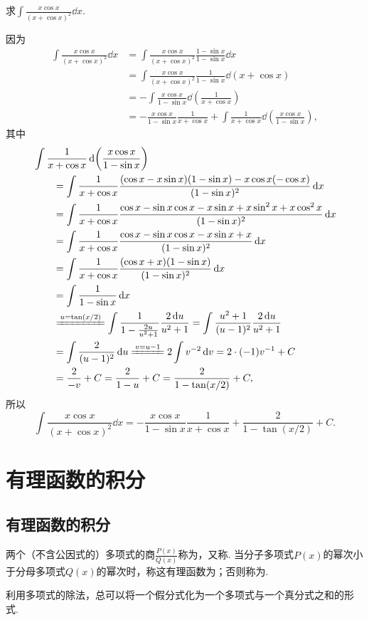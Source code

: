 \begin{example}
求\(\displaystyle\int \frac{x \cos x}{(x + \cos x)^2}\dd{x}\).
\begin{solution}
因为\begin{align*}
\int \frac{x \cos x}{(x + \cos x)^2}\dd{x}
&= \int \frac{x \cos x}{(x + \cos x)^2} \frac{1 - \sin x}{1 - \sin x}\dd{x} \\
&= \int \frac{x \cos x}{(x + \cos x)^2} \frac{1}{1 - \sin x} \dd(x + \cos x) \\
&= -\int \frac{x \cos x}{1 - \sin x} \dd(\frac{1}{x + \cos x}) \\
&= -\frac{x \cos x}{1 - \sin x} \frac{1}{x + \cos x}
	+\int \frac{1}{x + \cos x} \dd(\frac{x \cos x}{1 - \sin x}),
\end{align*}
其中
\begin{align*}
&\int \frac{1}{x + \cos x} \dd(\frac{x \cos x}{1 - \sin x}) \\
&\qquad= \int \frac{1}{x + \cos x}
	\frac{(\cos x  - x \sin x)(1 - \sin x) - x \cos x (-\cos x)}{(1 - \sin x)^2}\dd{x} \\
&\qquad= \int \frac{1}{x + \cos x}
	\frac{\cos x - \sin x \cos x - x \sin x + x \sin^2 x + x \cos^2 x}{(1 - \sin x)^2}\dd{x} \\
&\qquad= \int \frac{1}{x + \cos x}
	\frac{\cos x - \sin x \cos x - x \sin x + x}{(1 - \sin x)^2}\dd{x} \\
&\qquad= \int \frac{1}{x + \cos x}
	\frac{(\cos x + x)(1 - \sin x)}{(1 - \sin x)^2}\dd{x} \\
&\qquad= \int \frac{1}{1 - \sin x}\dd{x} \\
&\qquad\xlongequal{u=\tan(x/2)}
	\int \frac{1}{1 - \frac{2u}{u^2 + 1}} \frac{2\dd{u}}{u^2 + 1}
= \int \frac{u^2 + 1}{(u - 1)^2} \frac{2\dd{u}}{u^2 + 1} \\
&\qquad= \int \frac{2}{(u - 1)^2}\dd{u}
\xlongequal{v=u-1} 2 \int v^{-2}\dd{v}
= 2 \cdot (-1) v^{-1} + C \\
&\qquad= \frac{2}{-v} + C
= \frac{2}{1 - u} + C
= \frac{2}{1 - \tan(x/2)} + C,
\end{align*}
所以\[
\int \frac{x \cos x}{(x + \cos x)^2}\dd{x}
= -\frac{x \cos x}{1 - \sin x} \frac{1}{x + \cos x}
	+\frac{2}{1 - \tan(x/2)} + C.
\]
\end{solution}
\end{example}

\section{有理函数的积分}
\subsection{有理函数的积分}
\begin{definition}
两个（不含公因式的）多项式的商\(\frac{P(x)}{Q(x)}\)称为，又称.
当分子多项式\(P(x)\)的幂次小于分母多项式\(Q(x)\)的幂次时，称这有理函数为；否则称为.
\end{definition}
利用多项式的除法，总可以将一个假分式化为一个多项式与一个真分式之和的形式.

